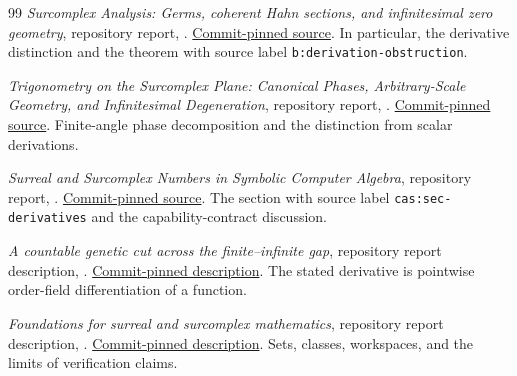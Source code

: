 \documentclass[11pt,a4paper]{article}
\numberwithin{equation}{section}
\theoremstyle{definition}
\theoremstyle{remark}
\begin{document}
\begin{thebibliography}{99}
\emph{Surcomplex Analysis: Germs, coherent Hahn sections, and infinitesimal
zero geometry}, repository report,
.
\href{https://github.com/VladimirReshetnikov/Surreal/blob/e260237db9b71da8b74a0c13c8e6355119091100/docs/surcomplex/analysis/article.tex}{Commit-pinned source}.
In particular, the derivative distinction and the theorem with source label
\texttt{b:derivation-obstruction}.

\emph{Trigonometry on the Surcomplex Plane: Canonical Phases,
Arbitrary-Scale Geometry, and Infinitesimal Degeneration}, repository report,
.
\href{https://github.com/VladimirReshetnikov/Surreal/blob/e260237db9b71da8b74a0c13c8e6355119091100/docs/surcomplex/trigonometry/article.tex}{Commit-pinned source}.
Finite-angle phase decomposition and the distinction from scalar derivations.

\emph{Surreal and Surcomplex Numbers in Symbolic Computer Algebra},
repository report,
.
\href{https://github.com/VladimirReshetnikov/Surreal/blob/e260237db9b71da8b74a0c13c8e6355119091100/docs/foundations-and-computation/computer-algebra/article.tex}{Commit-pinned source}.
The section with source label \texttt{cas:sec-derivatives} and the
capability-contract discussion.

\emph{A countable genetic cut across the finite--infinite gap},
repository report description,
.
\href{https://github.com/VladimirReshetnikov/Surreal/blob/e260237db9b71da8b74a0c13c8e6355119091100/docs/surreal/genetic-gaps-and-primitives/README.md}{Commit-pinned description}.
The stated derivative is pointwise order-field differentiation of a function.

\emph{Foundations for surreal and surcomplex mathematics},
repository report description,
.
\href{https://github.com/VladimirReshetnikov/Surreal/blob/e260237db9b71da8b74a0c13c8e6355119091100/docs/foundations-and-computation/foundations/README.md}{Commit-pinned description}.
Sets, classes, workspaces, and the limits of verification claims.
\end{thebibliography}
\end{document}
